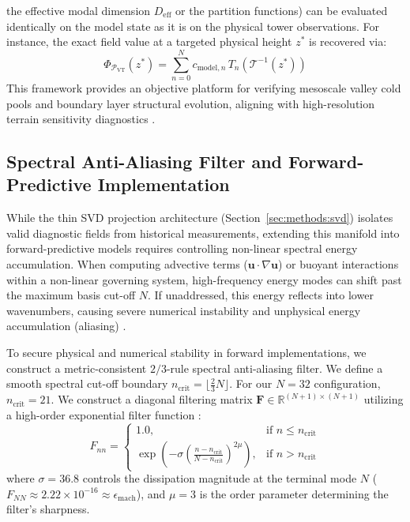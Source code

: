 the effective modal dimension $D_{\mathrm{eff}}$ or the partition functions) can be evaluated identically on the model state as it is on the physical tower observations. For instance, the exact field value at a targeted physical height $z^*$ is recovered via:
\begin{equation}
\Phi_{\mathcal{P}_{\mathrm{VT}}}(z^*) = \sum_{n=0}^{N} c_{\mathrm{model}, n} \, T_n\left( \mathcal{T}^{-1}(z^*) \right)
\label{eq:recovered_virtual_field}
\end{equation}
This framework provides an objective platform for verifying mesoscale valley cold pools and boundary layer structural evolution, aligning with high-resolution terrain sensitivity diagnostics \citep{Vosper2006, Barbano2022}.

\subsection{Spectral Anti-Aliasing Filter and Forward-Predictive Implementation}
\label{sec:extensions:antialiasing}

While the thin SVD projection architecture (Section~\ref{sec:methods:svd}) isolates valid diagnostic fields from historical measurements, extending this manifold into forward-predictive models requires controlling non-linear spectral energy accumulation. When computing advective terms ($\mathbf{u} \cdot \nabla \mathbf{u}$) or buoyant interactions within a non-linear governing system, high-frequency energy modes can shift past the maximum basis cut-off $N$. If unaddressed, this energy reflects into lower wavenumbers, causing severe numerical instability and unphysical energy accumulation (aliasing) \citep{Pellegrino2023}.

To secure physical and numerical stability in forward implementations, we construct a metric-consistent $2/3$-rule spectral anti-aliasing filter. We define a smooth spectral cut-off boundary $n_{\mathrm{crit}} = \lfloor \frac{2}{3} N \rfloor$. For our $N=32$ configuration, $n_{\mathrm{crit}} = 21$. We construct a diagonal filtering matrix $\mathbf{F} \in \mathbb{R}^{(N+1) \times (N+1)}$ utilizing a high-order exponential filter function \citep{Pellegrino2023, Halila2019}:
\begin{equation}
F_{nn} = \begin{cases}
1.0, & \text{if } n \le n_{\mathrm{crit}} \\
\exp\left( -\sigma \left( \frac{n - n_{\mathrm{crit}}}{N - n_{\mathrm{crit}}} \right)^{\! 2\mu} \right), & \text{if } n > n_{\mathrm{crit}}
\end{cases}
\label{eq:exponential_filter}
\end{equation}
where $\sigma = 36.8$ controls the dissipation magnitude at the terminal mode $N$ ($F_{NN} \approx 2.22 \times 10^{-16} \approx \epsilon_{\mathrm{mach}}$), and $\mu = 3$ is the order parameter determining the filter's sharpness.

